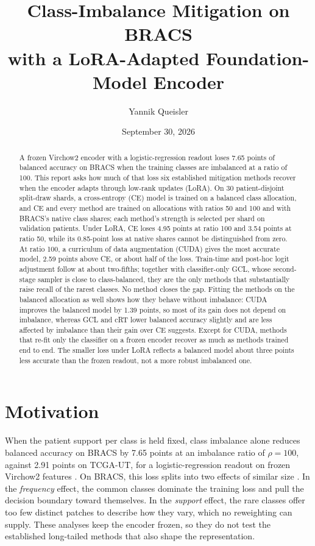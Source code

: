 \documentclass[11pt]{article}
\title{Class-Imbalance Mitigation on BRACS\\with a LoRA-Adapted Foundation-Model Encoder}
\author{Yannik Queisler}
\date{September 30, 2026}
\begin{document}
\raggedbottom
{}
\setlength{\emergencystretch}{2em}
\maketitle
\begin{abstract}
\noindent A frozen Virchow2 encoder with a logistic-regression readout loses 7.65 points of balanced accuracy on BRACS when the training classes are imbalanced at a ratio of 100. This report asks how much of that loss six established mitigation methods recover when the encoder adapts through low-rank updates (LoRA). On 30 patient-disjoint split-draw shards, a cross-entropy (CE) model is trained on a balanced class allocation, and CE and every method are trained on allocations with ratios 50 and 100 and with BRACS's native class shares; each method's strength is selected per shard on validation patients. Under LoRA, CE loses 4.95 points at ratio 100 and 3.54 points at ratio 50, while its 0.85-point loss at native shares cannot be distinguished from zero. At ratio 100, a curriculum of data augmentation (CUDA) gives the most accurate model, 2.59 points above CE, or about half of the loss. Train-time and post-hoc logit adjustment follow at about two-fifths; together with classifier-only GCL, whose second-stage sampler is close to class-balanced, they are the only methods that substantially raise recall of the rarest classes. No method closes the gap. Fitting the methods on the balanced allocation as well shows how they behave without imbalance: CUDA improves the balanced model by 1.39 points, so most of its gain does not depend on imbalance, whereas GCL and cRT lower balanced accuracy slightly and are less affected by imbalance than their gain over CE suggests. Except for CUDA, methods that re-fit only the classifier on a frozen encoder recover as much as methods trained end to end. The smaller loss under LoRA reflects a balanced model about three points less accurate than the frozen readout, not a more robust imbalanced one.
\end{abstract}

\section{Motivation}
\label{sec:motivation}
When the patient support per class is held fixed, class imbalance alone reduces balanced accuracy on BRACS by 7.65 points at an imbalance ratio of $\rho=100$, against 2.91 points on TCGA-UT, for a logistic-regression readout on frozen Virchow2 features \citep{queisler2026prevalenceBracs,queisler2026prevalenceTcga}. On BRACS, this loss splits into two effects of similar size \citep{queisler2026causeBracs}. In the \emph{frequency} effect, the common classes dominate the training loss and pull the decision boundary toward themselves. In the \emph{support} effect, the rare classes offer too few distinct patches to describe how they vary, which no reweighting can supply. These analyses keep the encoder frozen, so they do not test the established long-tailed methods that also shape the representation.
\end{document}
